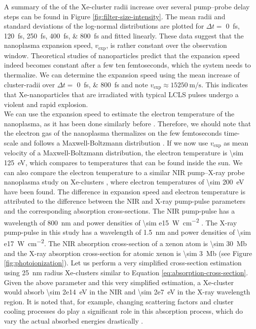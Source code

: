 A summary of the of the Xe-cluster radii increase over several pump--probe delay steps can be found in Figure \ref{fig:filter-size-intensity}. The mean radii and standard deviations of the log-normal distributions are plotted for $\Delta t=$ \SIlist{0;120;250;400;800}{\femto\second} and fitted linearly. These data suggest that the nanoplasma expansion speed, $v_{\text{exp}}$, is rather constant over the observation window. Theoretical studies of nanoparticles \cite{Hau-Riege-2004-PRE,Mikaberidze-2008-PRA,Ho-2016-PRA} predict that the expansion speed indeed becomes constant after a few ten femtoseconds, which the system needs to thermalize. We can determine the expansion speed using the mean increase of cluster-radii over $\Delta t=$ \SIlist{0;800}{\femto\second} and note $v_{\text{exp}}\approx \SI{15250}{\meter\per\second}$. This indicates that Xe-nanoparticles that are irradiated with typical LCLS pulses undergo a violent and rapid explosion.\\[1\baselineskip]
%
We can use the expansion speed to estimate the electron temperature of the nanoplasma, as it has been done similarly before \cite{Gorkhover-2012-PRL}. Therefore, we should note that the electron gas of the nanoplasma thermalizes on the few femtoseconds time-scale and follows a Maxwell-Boltzmann distribution \cite{Arbeiter-2011-NJP}. If we now use $v_{\text{exp}}$ as mean velocity of a Maxwell-Boltzmann distribution, the electron temperature is \SI{\sim 125}{\electronvolt}, which compares to temperatures that can be found inside the sun. We can also compare the electron temperature to a similar NIR pump--X-ray probe nanoplasma study on Xe-clusters \cite{Gorkhover-2016-NatPho}, where electron temperatures of \SI{\sim 200}{\electronvolt} have been found. The difference in expansion speed and electron temperature is attributed to the difference between the NIR and X-ray pump-pulse parameters and the corresponding absorption cross-sections. The NIR pump-pulse has a wavelength of \SI{800}{\nano\meter} and power densities of \SI{\sim e15}{\watt\per\square\centi\meter} \cite{Gorkhover-2016-NatPho}. The X-ray pump-pulse in this study has a wavelength of \SI{1.5}{\nano\meter} and power densities of \SI{\sim e17}{\watt\per\square\centi\meter}. The NIR absorption cross-section of a xenon atom is \SI{\sim 30}{\mega\barn} \cite{Fennel-2010-RMP} and the X-ray absorption cross-section for atomic xenon is \SI{\sim 3}{\mega\barn} (see Figure \ref{fig:photoionization}). Let us perform a very simplified cross-section estimation using \SI{25}{\nano\meter} radius Xe-clusters similar to Equation \eqref{eq:absorption-cross-section}. Given the above parameter and this very simplified estimation, a Xe-cluster would absorb \SI{\sim 2e14}{\electronvolt} in the NIR and \SI{\sim 2e7}{\electronvolt} in the X-ray wavelength region. It is noted that, for example, changing scattering factors and cluster cooling processes \cite{Fennel-2010-RMP} do play a significant role in this absorption process, which do vary the actual absorbed energies drastically \cite{Fennel-2010-RMP}.\\[1\baselineskip]
